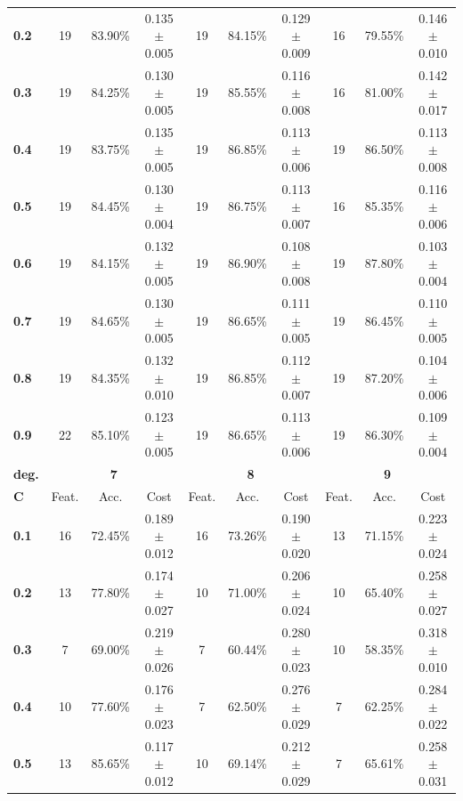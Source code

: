 \begin{table}[h]
{\begin{tabular}{l | c c c|c c c|c c c}
        \textbf{0.2} &    19 & 83.90\% & 0.135 $\pm$ 0.005 &    19 & 84.15\% & 0.129 $\pm$ 0.009 &    16 & 79.55\% & 0.146 $\pm$ 0.010\\
        \textbf{0.3} &    19 & 84.25\% & 0.130 $\pm$ 0.005 &    19 & 85.55\% & 0.116 $\pm$ 0.008 &    16 & 81.00\% & 0.142 $\pm$ 0.017\\
        \textbf{0.4} &    19 & 83.75\% & 0.135 $\pm$ 0.005 &    19 & 86.85\% & 0.113 $\pm$ 0.006 &    19 & 86.50\% & 0.113 $\pm$ 0.008\\
        \textbf{0.5} &    19 & 84.45\% & 0.130 $\pm$ 0.004 &    19 & 86.75\% & 0.113 $\pm$ 0.007 &    16 & 85.35\% & 0.116 $\pm$ 0.006\\
        \textbf{0.6} &    19 & 84.15\% & 0.132 $\pm$ 0.005 &    19 & 86.90\% & 0.108 $\pm$ 0.008 &    19 & 87.80\% & 0.103 $\pm$ 0.004\\
        \textbf{0.7} &    19 & 84.65\% & 0.130 $\pm$ 0.005 &    19 & 86.65\% & 0.111 $\pm$ 0.005 &    19 & 86.45\% & 0.110 $\pm$ 0.005\\
        \textbf{0.8} &    19 & 84.35\% & 0.132 $\pm$ 0.010 &    19 & 86.85\% & 0.112 $\pm$ 0.007 &    19 & 87.20\% & 0.104 $\pm$ 0.006\\
        \textbf{0.9} &    22 & 85.10\% & 0.123 $\pm$ 0.005 &    19 & 86.65\% & 0.113 $\pm$ 0.006 &    19 & 86.30\% & 0.109 $\pm$ 0.004\\
        \bottomrule
        \toprule
        \multicolumn{1}{c}{\textbf{deg.}} & \multicolumn{3}{c}{\textbf{7}} & \multicolumn{3}{c}{\textbf{8}} & \multicolumn{3}{c}{\textbf{9}}\\
        \midrule
        \textbf{C}&Feat.&Acc.&Cost&Feat.&Acc.&Cost&Feat.&Acc.&Cost \\
        \midrule
        \textbf{0.1} &    16 & 72.45\% & 0.189 $\pm$ 0.012 &    16 & 73.26\% & 0.190 $\pm$ 0.020 &    13 & 71.15\% & 0.223 $\pm$ 0.024\\
        \textbf{0.2} &    13 & 77.80\% & 0.174 $\pm$ 0.027 &    10 & 71.00\% & 0.206 $\pm$ 0.024 &    10 & 65.40\% & 0.258 $\pm$ 0.027\\
        \textbf{0.3} &     7 & 69.00\% & 0.219 $\pm$ 0.026 &     7 & 60.44\% & 0.280 $\pm$ 0.023 &    10 & 58.35\% & 0.318 $\pm$ 0.010\\
        \textbf{0.4} &    10 & 77.60\% & 0.176 $\pm$ 0.023 &     7 & 62.50\% & 0.276 $\pm$ 0.029 &     7 & 62.25\% & 0.284 $\pm$ 0.022\\
        \textbf{0.5} &    13 & 85.65\% & 0.117 $\pm$ 0.012 &    10 & 69.14\% & 0.212 $\pm$ 0.029 &     7 & 65.61\% & 0.258 $\pm$ 0.031\\

\end{tabular}}
\end{table}
